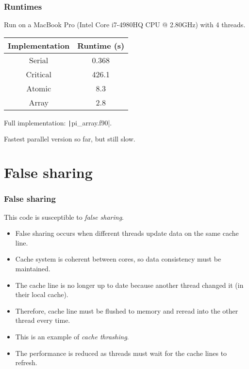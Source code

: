 \documentclass{beamer}
\begin{document}
\begin{frame}
\frametitle{Runtimes}
Run on a MacBook Pro (Intel Core i7-4980HQ CPU @ 2.80GHz) with 4 threads.

\vfill

\begin{table}
\begin{tabular}{cc}
\toprule
Implementation & Runtime (s) \\
\midrule
Serial   & 0.368 \\
Critical & 426.1 \\
Atomic   & 8.3 \\
Array    & 2.8 \\
\bottomrule
\end{tabular}
\end{table}

Full implementation: \texttt|pi_array.f90|.

\begin{center}
\large Fastest parallel version so far, but still slow.
\end{center}

\end{frame}

\section{False sharing}
\begin{frame}
\frametitle{False sharing}
This code is susceptible to \emph{false sharing}.
\begin{itemize}
  \item False sharing occurs when different threads update data on the same cache line.
  \item Cache system is coherent between cores, so data consistency must be maintained.
  \item The cache line is no longer up to date because another thread changed it (in their local cache).
  \item Therefore, cache line must be flushed to memory and reread into the other thread every time.
  \item This is an example of \emph{cache thrashing}.
  \item The performance is reduced as threads must wait for the cache lines to refresh.
\end{itemize}
\end{frame}
\end{document}

